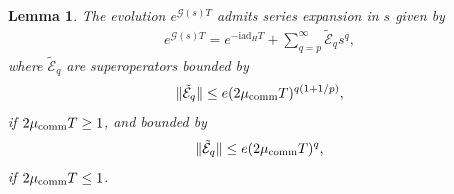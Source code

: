 \documentclass[11pt]{article}
\newtheorem{lemma}{Lemma}
\renewcommand{\i}{\mathrm{i}}
\newcommand{\ad}{\mathrm{ad}}
\newcommand{\G}{\mathcal{G}}
\newcommand{\E}{\mathcal{E}}
\begin{document}
\begin{lemma}
\label{lem:expansion-exp-G(s)}
    The evolution $e^{\G(s) T}$ admits series expansion in $s$ given by \begin{align*}
        e^{\G(s) T}=e^{-\i \ad_H T}+ \sum_{q=p}^{\infty}\tilde{\E}_{q} s^q,
    \end{align*}
    where $\tilde{\E}_{q}$ are superoperators bounded by \begin{align*}
       \|\tilde{\E}_{q}\|\le   e(2\mu_{\rm comm}T)^{q(1+1/p)},
    \end{align*}
    if $2\mu_{\rm comm}T\ge 1$, and bounded by \begin{align*}
        \|\tilde{\E}_{q}\|\le e(2\mu_{\rm comm}T)^{q},
    \end{align*}
    if $2\mu_{\rm comm}T\le 1$.
\end{lemma}
\end{document}
